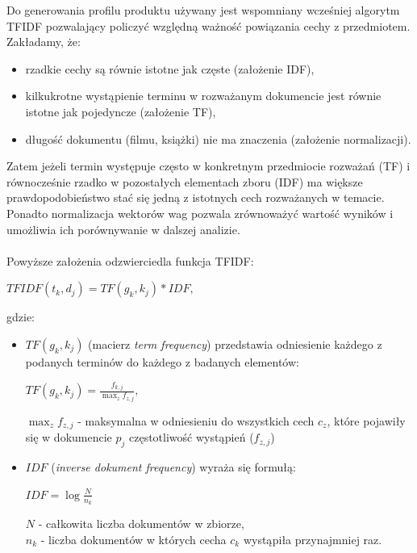 \documentclass[12pt,a4paper]{report}
\begin{document}
Do generowania profilu produktu używany jest wspomniany wcześniej algorytm TFIDF pozwalający policzyć względną ważność powiązania cechy z przedmiotem. Zakładamy, że:
\begin{itemize}
\item rzadkie cechy są równie istotne jak częste (założenie IDF),
\item kilkukrotne wystąpienie terminu w rozważanym dokumencie jest równie istotne jak pojedyncze (założenie TF),
\item długość dokumentu (filmu, książki) nie ma znaczenia (założenie normalizacji).  
\end{itemize}
Zatem jeżeli termin występuje często w konkretnym przedmiocie rozważań (TF) i równocześnie rzadko w pozostałych elementach zboru (IDF) ma większe prawdopodobieństwo stać się jedną z istotnych cech rozważanych w temacie. Ponadto normalizacja wektorów wag pozwala zrównoważyć wartość wyników i umożliwia ich porównywanie w dalszej analizie.
\\
\\Powyższe założenia odzwierciedla funkcja TFIDF:
\begin{center}
\begin{math}
TFIDF(t_k, d_j) = TF(g_k, k_j) * IDF,
\end{math}
\end{center}
gdzie:
\begin{itemize}
\item \begin{math}TF(g_k, k_j)  \end{math} (macierz \textit{term frequency}) przedstawia odniesienie każdego z podanych terminów do każdego z badanych elementów:
\begin{center}
\begin{math}
TF(g_k, k_j)=\frac{f_{k,j}}{\max_{z}f_{z,j}},
\end{math}
\end{center}
$\max_{z}f_{z,j}$ - maksymalna w odniesieniu do wszystkich cech $c_z$, które pojawiły się w dokumencie $p_j$ częstotliwość wystąpień ($f_{z,j}$) 

\item \begin{math}IDF \end{math} (\textit{inverse dokument frequency}) wyraża się formułą:
\begin{center}
\begin{math}IDF = \log \frac{N}{n_k} \end{math}
\end{center}
$N$ - całkowita liczba dokumentów w zbiorze,
\\$n_k$ - liczba dokumentów w których cecha $c_k$ wystąpiła przynajmniej raz.
\end{itemize}
\end{document}
